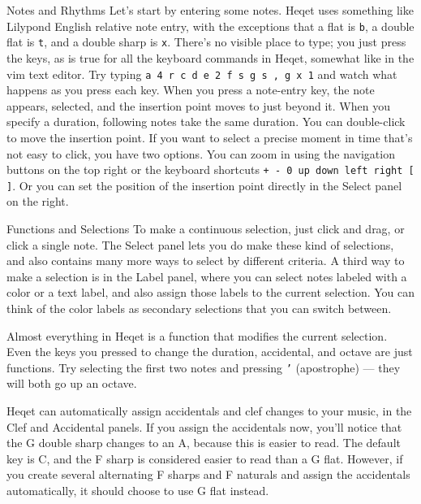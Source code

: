 \documentclass{article}
\begin{document}
\begin{section}{Notes and Rhythms}
Let's start by entering some notes. Heqet uses something like Lilypond English relative note entry, with the exceptions that a flat is \texttt{b}, a double flat is \texttt{t}, and a double sharp is \texttt{x}. There's no visible place to type; you just press the keys, as is true for all the keyboard commands in Heqet, somewhat like in the vim text editor. Try typing \verb+a 4 r c d e 2 f s g s , g x 1+ and watch what happens as you press each key. When you press a note-entry key, the note appears, selected, and the insertion point moves to just beyond it. When you specify a duration, following notes take the same duration. 
You can double-click to move the insertion point. If you want to select a precise moment in time that's not easy to click, you have two options. You can zoom in using the navigation buttons on the top right or the keyboard shortcuts \texttt{+ - 0 up down left right [ ]}. Or you can set the position of the insertion point directly in the Select panel on the right. 
\end{section}

\begin{section}{Functions and Selections}
To make a continuous selection, just click and drag, or click a single note. The Select panel lets you do make these kind of selections, and also contains many more ways to select by different criteria. A third way to make a selection is in the Label panel, where you can select notes labeled with a color or a text label, and also assign those labels to the current selection. You can think of the color labels as secondary selections that you can switch between.

Almost everything in Heqet is a function that modifies the current selection. Even the keys you pressed to change the duration, accidental, and octave are just functions. Try selecting the first two notes and pressing \texttt{'} (apostrophe) --- they will both go up an octave. 

Heqet can automatically assign accidentals and clef changes to your music, in the Clef and Accidental panels.  If you assign the accidentals now, you'll notice that the G double sharp changes to an A, because this is easier to read. The default key is C, and the F sharp is considered easier to read than a G flat. However, if you create several alternating F sharps and F naturals and assign the accidentals automatically, it should choose to use G flat instead.

\end{section}
\end{document}
